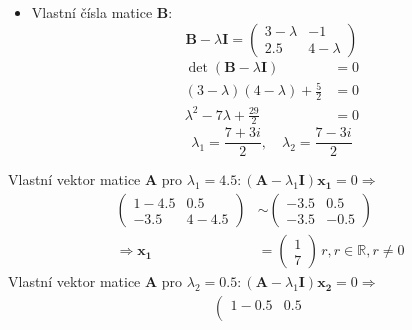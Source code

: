 \begin{example}
    \begin{itemize}
      \item Vlastní čísla matice \textbf{B}:
        \begin{equation*}
             \textbf{B} - \lambda\textbf{I}=
               \left(\begin{array}{cc}
                       3-\lambda  & -1             \\
                       2.5        &  4-\lambda
                     \end{array}
               \right)
        \end{equation*}
        \begin{align*}
           \det(\mathbf{B}-\lambda\mathbf{I}) &= 0 \\
           (3-\lambda)(4-\lambda)+\frac{5}{2} &= 0 \\
           \lambda^2-7\lambda+\frac{29}{2}    &= 0
        \end{align*}
        \begin{equation*}
           \lambda_1 = \frac{7+3i}{2},\quad \lambda_2 = \frac{7-3i}{2}
        \end{equation*}
    \end{itemize}
  Vlastní vektor matice $\mathbf{A}$ pro $\lambda_1=4.5:
  (\mathbf{A}-\lambda_1\mathbf{I})\mathbf{x_1}=0 \Rightarrow$
  \begin{align*}
    \left(
      \begin{array}{cc}
         1  -4.5  &  0.5   \\
        -3.5      &  4-4.5
      \end{array}
    \right) &\sim
    \left(
      \begin{array}{cc}
        -3.5  &  0.5       \\
        -3.5  & -0.5
      \end{array}
    \right)                         \\
    \Rightarrow\mathbf{x_1} &=
      \left(
        \begin{array}{c}
          1 \\ 7
        \end{array}
      \right)\, r, r\in\mathbb{R}, r\neq0
  \end{align*}
  Vlastní vektor matice $\mathbf{A}$ pro $\lambda_2=0.5:
  (\mathbf{A}-\lambda_1\mathbf{I})\mathbf{x_2}=0 \Rightarrow$
  \begin{align*}
    \left(
      \begin{array}{cc}
         1  -0.5  &  0.5   \\

\end{array}
\end{align*}
\end{example}
